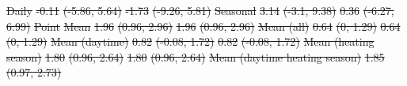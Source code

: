 \documentclass[
  letterpaper,
  DIV=11,
  numbers=noendperiod]{scrartcl}
\makeatletter
\renewenvironment{table}%
   {\renewcommand\familydefault\sfdefault
    \@float{table}}
   {\end@float}
\providecommand{\DIFdel}[1]{{\protect\color{red}\sout{#1}}}                      %
\providecommand{\DIFdelFL}[1]{\DIFdel{#1}} %
\makeatother
\begin{document}
\begin{table}
\DIFdelFL{\hspace{1em} }%
\DIFdelFL{Daily }%
\DIFdelFL{-0.11 }%
\DIFdelFL{(-5.86, 5.64) }%
\DIFdelFL{-1.73 }%
\DIFdelFL{(-9.26, 5.81)}%
\DIFdelFL{Seasonal }%
\DIFdelFL{3.14 }%
\DIFdelFL{(-3.1, 9.38) }%
\DIFdelFL{0.36 }%
\DIFdelFL{(-6.27, 6.99)}%
\DIFdelFL{\hspace{1em}Point }%
\DIFdelFL{Mean }%
\DIFdelFL{1.96 }%
\DIFdelFL{(0.96, 2.96) }%
\DIFdelFL{1.96 }%
\DIFdelFL{(0.96, 2.96)}%
\DIFdelFL{\hspace{1em} }%
\DIFdelFL{Mean (all) }%
\DIFdelFL{0.64 }%
\DIFdelFL{(0, 1.29) }%
\DIFdelFL{0.64 }%
\DIFdelFL{(0, 1.29)}%
\DIFdelFL{\hspace{1em} }%
\DIFdelFL{Mean (daytime) }%
\DIFdelFL{0.82 }%
\DIFdelFL{(-0.08, 1.72) }%
\DIFdelFL{0.82 }%
\DIFdelFL{(-0.08, 1.72)}%
\DIFdelFL{\hspace{1em} }%
\DIFdelFL{Mean (heating season) }%
\DIFdelFL{1.80 }%
\DIFdelFL{(0.96, 2.64) }%
\DIFdelFL{1.80 }%
\DIFdelFL{(0.96, 2.64)}%
\DIFdelFL{\hspace{1em} }%
\DIFdelFL{Mean (daytime heating season) }%
\DIFdelFL{1.85 }%
\DIFdelFL{(0.97, 2.73) }%

\end{table}
\end{document}
